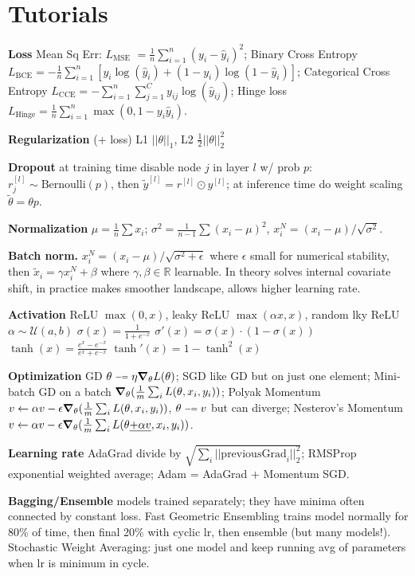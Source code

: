 \section{Tutorials}

\textbf{Loss} Mean Sq Err: $L_{\text{MSE}} $ $= \frac{1}{n} \sum_{i=1}^{n} (y_i - \hat{y}_i)^2$; Binary Cross Entropy $L_{\text{BCE}} = -\frac{1}{n} \sum_{i=1}^{n} \left[ y_i \log(\hat{y}_i) + (1 - y_i) \log(1 - \hat{y}_i) \right]$; Categorical Cross Entropy $L_{\text{CCE}} = -\sum_{i=1}^{n} \sum_{j=1}^{C} y_{ij} \log(\hat{y}_{ij})$; Hinge loss $L_{\text{Hinge}} = \frac{1}{n} \sum_{i=1}^{n} \max(0, 1 - y_i \hat{y}_i)$.

\textbf{Regularization} (+ loss) L1 $||\theta||_1$,  L2 $\tfrac{1}{2}||\theta||_2^2$

\textbf{Dropout} at training time disable node $j$ in layer $l$ w/ prob $p$: $r_j^{[l]} \sim \text{Bernoulli}(p)$, then $\tilde{y}^{[l]}=r^{[l]} \odot y^{[l]}$; at inference time do weight scaling $\tilde{\theta} = \theta p$.

\textbf{Normalization} $\mu = \tfrac{1}{n} \sum x_i$; $\sigma^2 = \tfrac{1}{n-1} \sum (x_i - \mu)^2$, $x_{i}^N = (x_i-\mu) / \sqrt{\sigma^2}$.

\textbf{Batch norm.} $x_{i}^N = (x_i-\mu) / \sqrt{\sigma^2 + \epsilon}$ where $\epsilon$ small for numerical stability, then $\tilde{x}_{i} = \gamma x_i^N + \beta$ where $\gamma, \beta \in \mathbb{R}$ learnable. In theory solves internal covariate shift, in practice makes smoother landscape, allows higher learning rate.


\textbf{Activation} ReLU $\max(0,x)$, leaky ReLU $\max(\alpha x,x)$, random lky ReLU $\alpha \sim \mathcal{U}(a,b)$
\(\sigma(x) = \frac{1}{1+e^{-x}}\)  \(\sigma'(x) = \sigma(x) \cdot (1 - \sigma(x))\)
\(\tanh(x) = \frac{e^x - e^{-x}}{e^x + e^{-x}}\)  \(\tanh'(x) = 1-\tanh^2(x)\)

\newcommand{\minuseq}{\mathrel{\vcenter{\hbox{\scriptsize$-\!\!=$}}}}
\textbf{Optimization} GD $\theta \minuseq \eta \grad_\theta{L(\theta)}$; SGD like GD but on just one element; Mini-batch GD on a batch $\grad_{\theta} (\tfrac{1}{m} \sum_i L(\theta, x_i, y_i))$; Polyak Momentum $v \leftarrow \alpha v - \epsilon \grad_{\theta} (\tfrac{1}{m} \sum_i L(\theta, x_i, y_i))$, $\theta \minuseq v$ but can diverge; Nesterov's Momentum $v \leftarrow \alpha v - \epsilon \grad_{\theta} (\tfrac{1}{m} \sum_i L(\theta \text{\underline{$+ \alpha v$}}, x_i, y_i))$.

\textbf{Learning rate} AdaGrad divide by $\sqrt{\sum_i ||\text{previousGrad}_i||_2^2}$; RMSProp exponential weighted average; Adam = AdaGrad + Momentum SGD.

\textbf{Bagging/Ensemble} models trained separately; they have minima often connected by constant loss. Fast Geometric Ensembling trains model normally for 80\% of time, then final 20\% with cyclic lr, then ensemble (but many models!). Stochastic Weight Averaging: just one model and keep running avg of parameters when lr is minimum in cycle.
